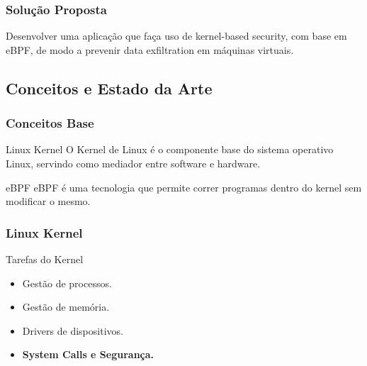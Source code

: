 \documentclass[pdflatex,compress]{beamer}
\begin{document}
\begin{frame}

\frametitle{Solução Proposta}

Desenvolver uma aplicação que faça uso de kernel-based security, com base em eBPF, de modo a prevenir data exfiltration em máquinas virtuais.

\end{frame}

\subsection{Conceitos e Estado da Arte}


\begin{frame}
\frametitle{Conceitos Base}

\pause
\begin{exampleblock}{Linux Kernel}
    O Kernel de Linux é o componente base do sistema operativo Linux, servindo como mediador entre software e hardware.
\end{exampleblock}

\bigskip

\pause
\begin{exampleblock}{eBPF}
    eBPF é uma tecnologia que permite correr programas dentro do kernel sem modificar o mesmo.
\end{exampleblock}

\end{frame}

\begin{frame}
\frametitle{Linux Kernel}

\begin{exampleblock}{Tarefas do Kernel}
    \begin{itemize}
        \pause
        \item Gestão de processos. 
        \pause    
    \item Gestão de memória. 
        \pause
    \item Drivers de dispositivos. 
        \pause
        \item\textbf{System Calls e Segurança.}
    \end{itemize}
\end{exampleblock}


\end{frame}
\end{document}
